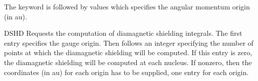 \begin{keywordlist}
The keyword is followed by values which specifies the angular momentum
origin (in au).
\item[DSHD]
Requests the computation of diamagnetic shielding integrals. The first
entry specifies the gauge origin. Then follows an integer
specifying the number of points at which the diamagnetic
shielding will be computed. If this entry is zero, the diamagnetic
shielding will be computed at each nucleus. If nonzero, then the
coordinates (in au) for each origin has to be supplied, one entry for each
origin.


\end{keywordlist}
